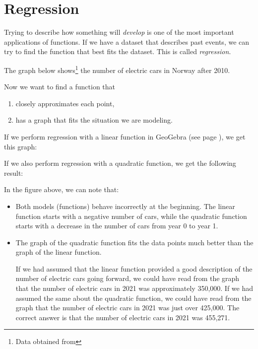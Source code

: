 \section{Regression \label{Regression}}
Trying to describe how something will \textsl{develop} is one of the most important applications of functions. If we have a dataset that describes past events, we can try to find the function that best fits the dataset. This is called \textsl{regression}.

The graph below shows\footnote{Data obtained from } the number of electric cars in Norway after 2010.

Now we want to find a function that

\begin{enumerate}[label=(\roman*)]
	\item closely approximates each point, 	
	\item has a graph that fits the situation we are modeling.
\end{enumerate}

If we perform regression with a linear function in GeoGebra (see page \pageref{ggbreg}), we get this graph:

If we also perform regression with a quadratic function, we get the following result:

In the figure above, we can note that:
\begin{itemize}
	\item Both models (functions) behave incorrectly at the beginning. The linear function starts with a negative number of cars, while the quadratic function starts with a decrease in the number of cars from year 0 to year 1.
	\item The graph of the quadratic function fits the data points much better than the graph of the linear function.
	
	If we had assumed that the linear function provided a good description of the number of electric cars going forward, we could have read from the graph that the number of electric cars in 2021 was approximately 350,000. If we had assumed the same about the quadratic function, we could have read from the graph that the number of electric cars in 2021 was just over 425,000. The correct answer is that the number of electric cars in 2021 was 455,271.
\end{itemize}
\newpage



